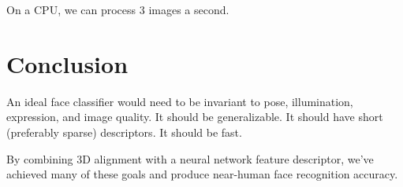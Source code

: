 \documentclass[a4paper]{article}
\begin{document}
On a CPU, we can process 3 images a second.

\section{Conclusion}
An ideal face classifier would need to be invariant to pose, illumination,
expression, and image quality. It should be generalizable. It should have
short (preferably sparse) descriptors. It should be fast.

By combining 3D alignment with a neural network feature descriptor, we've 
achieved many of these goals and produce near-human face recognition accuracy.
\end{document}
